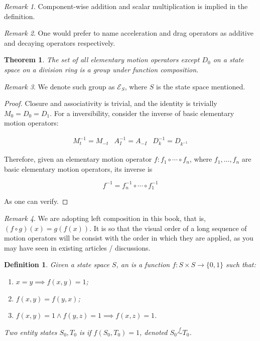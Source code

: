 \documentclass{book}
\newtheorem{definition}{Definition}
\newtheorem{theorem}{Theorem}
\theoremstyle{definition}\newtheorem{mechanism}{Mechanism}
\theoremstyle{remark}\newtheorem*{remark}{Remark}
\begin{document}
\begin{remark}
	Component-wise addition and scalar multiplication is implied in the definition.
\end{remark}

\begin{remark}
	One would prefer to name acceleration and drag operators as additive and decaying operators respectively.
\end{remark}

\begin{theorem}
	The set of all elementary motion operators except $D_0$ on a state space on a division ring is a group under function composition.
\end{theorem}

\begin{remark}
	We denote such group as $\mathcal{E}_S$, where $S$ is the state space mentioned.
\end{remark}

\begin{proof}
	Closure and associativity is trivial, and the identity is trivially $M_0 = D_0 = D_1$. For a inversibility, consider the inverse of basic elementary motion operators:
	
	\begin{equation*}
		\begin{matrix}
			M_{t}^{-1} = M_{-t}&
			A_{I}^{-1} = A_{-I}&
			D_{k}^{-1} = D_{k^{-1}}
		\end{matrix}
	\end{equation*}
	
	Therefore, given an elementary motion operator $f: f_1 \circ \cdots \circ f_n$, where $f_1, \dots, f_n$ are basic elementary motion operators, its inverse is
	
	\begin{equation*}
		f^{-1} = f_n^{-1} \circ \cdots \circ f_1^{-1}
	\end{equation*}
	
	As one can verify.
\end{proof}

\begin{remark}
	We are adopting left composition in this book, that is, $(f \circ g)(x) = g(f(x))$. It is so that the visual order of a long sequence of motion operators will be consist with the order in which they are applied, as you may have seen in existing articles / discussions.
\end{remark}

\begin{definition}
	Given a state space $S$, an  is a function $f: S \times S \to \{0, 1\}$ such that:
	
	\begin{enumerate}
		\item $x = y \implies f(x, y) = 1$;
		\item $f(x, y) = f(y, x)$;
		\item $f(x, y) = 1 \land f(y, z) = 1 \implies f(x, z) = 1$.
	\end{enumerate}
	
	Two entity states $S_0, T_0$ is  if $f(S_0, T_0) = 1$, denoted $S_0 \overset{f}{\sim} T_0$.
\end{definition}
\end{document}
